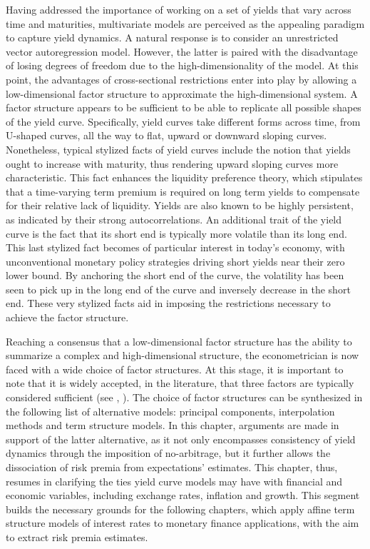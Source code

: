 Having addressed the importance of working on a set of yields that vary across time and maturities, multivariate models are perceived as the appealing paradigm to capture yield dynamics. A natural response is to consider an unrestricted vector autoregression model. However, the latter is paired with the disadvantage of losing degrees of freedom due to the high-dimensionality of the model. At this point, the advantages of cross-sectional restrictions enter into play by allowing a low-dimensional factor structure to approximate the high-dimensional system. A factor structure appears to be sufficient to be able to replicate all possible shapes of the yield curve. Specifically, yield curves take different forms across time, from U-shaped curves, all the way to flat, upward or downward sloping curves. Nonetheless, typical stylized facts of yield curves include the notion that yields ought to increase with maturity, thus rendering upward sloping curves more characteristic. This fact enhances the liquidity preference theory, which stipulates that a time-varying term premium is required on long term yields to compensate for their relative lack of liquidity. Yields are also known to be highly persistent, as indicated by their strong autocorrelations. An additional trait of the yield curve is the fact that its short end is typically more volatile than its long end. This last stylized fact becomes of particular interest in today's economy, with unconventional monetary policy strategies driving short yields near their zero lower bound. By anchoring the short end of the curve, the volatility has been seen to pick up in the long end of the curve and inversely decrease in the short end. These very stylized facts aid in imposing the restrictions necessary to achieve the factor structure. 

Reaching a consensus that a low-dimensional factor structure has the ability to summarize a complex and high-dimensional structure, the econometrician is now faced with a wide choice of factor structures. At this stage, it is important to note that it is widely accepted, in the literature, that three factors are typically considered sufficient (see \cite{litterman_1991}, \cite{piazzesi_2003}). The choice of factor structures can be synthesized in the following list of alternative models: principal components, interpolation methods and term structure models. In this chapter, arguments are made in support of the latter alternative, as it not only encompasses consistency of yield dynamics through the imposition of no-arbitrage, but it further allows the dissociation of risk premia from expectations' estimates. This chapter, thus, resumes in clarifying the ties yield curve models may have with financial and economic variables, including exchange rates, inflation and growth. This segment builds the necessary grounds for the following chapters, which apply affine term structure models of interest rates to monetary finance applications, with the aim to extract risk premia estimates. 

